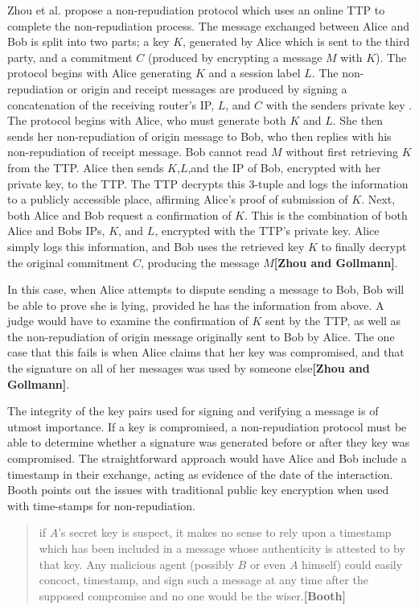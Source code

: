 \documentclass[12pt]{article}
\newcommand{\lcite}[1]
{{\bfseries\color{orange}[#1]}}
\begin{document}
			Zhou et al. propose a non-repudiation protocol which uses an online TTP to complete the non-repudiation process. The message exchanged between Alice and Bob is split into two parts; a key $K$, generated by Alice which is sent to the third party, and a commitment $C$ (produced by encrypting a message $M$ with $K$). The protocol begins with Alice generating $K$ and a session label $L$. The non-repudiation or origin and receipt messages are produced by signing a concatenation of the receiving router's IP, $L$, and $C$ with the senders private key . The protocol begins with Alice, who must generate both $K$ and $L$. She then sends her non-repudiation of origin message to Bob, who then replies with his non-repudiation of receipt message. Bob cannot read $M$ without first retrieving $K$ from the TTP. Alice then sends $K$,$L$,and the IP of Bob, encrypted with her private key, to the TTP. The TTP decrypts this 3-tuple and logs the information to a publicly accessible place, affirming Alice's proof of submission of $K$. Next, both Alice and Bob request a confirmation of $K$. This is the combination of both Alice and Bobs IPs, $K$, and $L$, encrypted with the TTP's private key. Alice simply logs this information, and Bob uses the retrieved key $K$ to finally decrypt the original commitment $C$, producing the message $M$\lcite{Zhou and Gollmann}.

			In this case, when Alice attempts to dispute sending a message to Bob, Bob will be able to prove she is lying, provided he has the information from above. A judge would have to examine the confirmation of $K$ sent by the TTP, as well as the non-repudiation of origin message originally sent to Bob by Alice. The one case that this fails is when Alice claims that her key was compromised, and that the signature on all of her messages was used by someone else\lcite{Zhou and Gollmann}.

			The integrity of the key pairs used for signing and verifying a message is of utmost importance. If a key is compromised, a non-repudiation protocol must be able to determine whether a signature was generated before or after they key was compromised. The straightforward approach would have Alice and Bob include a timestamp in their exchange, acting as evidence of the date of the interaction. Booth points out the issues with traditional public key encryption when used with time-stamps for non-repudiation.
			\begin{quote}
				if $A$'s secret key is suspect, it makes no sense to rely upon a timestamp which has been included in a message whose authenticity is attested to by that key. Any malicious agent (possibly $B$ or even $A$ himself) could easily concoct, timestamp, and sign such a message at any time after the supposed compromise and no one would be the wiser.\lcite{Booth}
			\end{quote}
\end{document}
